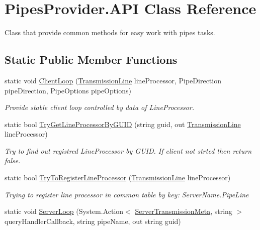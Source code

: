 \hypertarget{class_pipes_provider_1_1_a_p_i}{}\section{Pipes\+Provider.\+A\+PI Class Reference}
\label{class_pipes_provider_1_1_a_p_i}


Class that provide common methods for easy work with pipes\textquotesingle{} tasks.  


\subsection*{Static Public Member Functions}
\begin{DoxyCompactItemize}
\item 
static void \mbox{\hyperlink{class_pipes_provider_1_1_a_p_i_aaccf777b3b489b550739dd8adcf4a1d3}{Client\+Loop}} (\mbox{\hyperlink{class_pipes_provider_1_1_transmission_line}{Transmission\+Line}} line\+Processor, Pipe\+Direction pipe\+Direction, Pipe\+Options pipe\+Options)
\begin{DoxyCompactList}\small\item\em Provide stable client loop controlled by data of Line\+Processor. \end{DoxyCompactList}\item 
static bool \mbox{\hyperlink{class_pipes_provider_1_1_a_p_i_ad57a87e88181644685a947f951b9fe0f}{Try\+Get\+Line\+Processor\+By\+G\+U\+ID}} (string guid, out \mbox{\hyperlink{class_pipes_provider_1_1_transmission_line}{Transmission\+Line}} line\+Processor)
\begin{DoxyCompactList}\small\item\em Try to find out registred Line\+Processor by G\+U\+ID. If client not strted then return false. \end{DoxyCompactList}\item 
static bool \mbox{\hyperlink{class_pipes_provider_1_1_a_p_i_af785a9d8707a831a6b84ac63ae96e755}{Try\+To\+Register\+Line\+Processor}} (\mbox{\hyperlink{class_pipes_provider_1_1_transmission_line}{Transmission\+Line}} line\+Processor)
\begin{DoxyCompactList}\small\item\em Trying to register line processor in common table by key\+: Server\+Name.\+Pipe\+Line \end{DoxyCompactList}\item 
static void \mbox{\hyperlink{class_pipes_provider_1_1_a_p_i_abea09e221bfe03713f46b7223c6dd62f}{Server\+Loop}} (System.\+Action$<$ \mbox{\hyperlink{class_pipes_provider_1_1_server_transmission_meta}{Server\+Transmission\+Meta}}, string $>$ query\+Handler\+Callback, string pipe\+Name, out string guid)

\end{DoxyCompactItemize}
